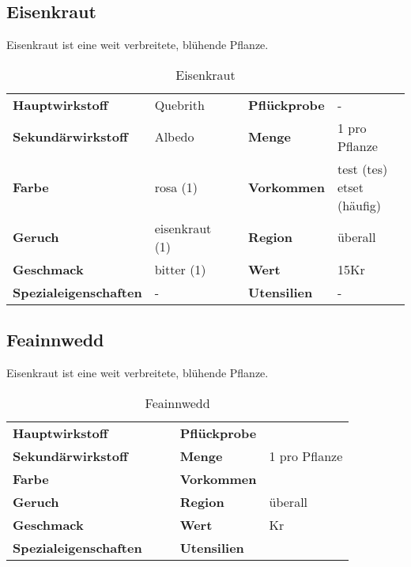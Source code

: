 \subsection{Eisenkraut}
Eisenkraut ist eine weit verbreitete, blühende Pflanze. 

\begin{table}[h] 
\begin{center} 
\begin{tabular}{|l|l|p{1cm}|l|l|} 
  	\cline{1-2} \cline{4-5} 
  	\textbf{Hauptwirkstoff} & Quebrith && \textbf{Pflückprobe} & - \\ \cline{1-2} \cline{4-5} 
  	\textbf{Sekundärwirkstoff} & Albedo && \textbf{Menge} & 1 pro Pflanze \\ \cline{1-2} \cline{4-5} 
  	\textbf{Farbe} & rosa (1) && \textbf{Vorkommen} & \brcell{test (tes) \\ etset (häufig)} \\ \cline{1-2} \cline{4-5} 
  	\textbf{Geruch} & eisenkraut (1) && \textbf{Region} & überall \\ \cline{1-2} \cline{4-5} 
  	\textbf{Geschmack} & bitter (1) && \textbf{Wert} & 15Kr \\ \cline{1-2} \cline{4-5} 
  	\textbf{Spezialeigenschaften} & - && \textbf{Utensilien} & - \\ \cline{1-2} \cline{4-5} 
\end{tabular} 
\end{center} 
\caption{Eisenkraut} 
\label{tab:eisenkraut} 
\end{table}


\subsection{Feainnwedd}
Eisenkraut ist eine weit verbreitete, blühende Pflanze. 

\begin{table}[h]
\begin{center}
\begin{tabular}{|l|l|p{1cm}|l|l|}
	\cline{1-2} \cline{4-5}
	\textbf{Hauptwirkstoff} &  && \textbf{Pflückprobe} &  \\ \cline{1-2} \cline{4-5}
	\textbf{Sekundärwirkstoff} &  && \textbf{Menge} & 1 pro Pflanze \\ \cline{1-2} \cline{4-5}
	\textbf{Farbe} &  && \textbf{Vorkommen} &  \\ \cline{1-2} \cline{4-5}
	\textbf{Geruch} &  && \textbf{Region} & überall \\ \cline{1-2} \cline{4-5}
	\textbf{Geschmack} &  && \textbf{Wert} & Kr \\ \cline{1-2} \cline{4-5}
	\textbf{Spezialeigenschaften} &  && \textbf{Utensilien} &  \\ \cline{1-2} \cline{4-5}
\end{tabular}
\end{center}
\caption{Feainnwedd}
\label{tab:feainnwedd}
\end{table}


